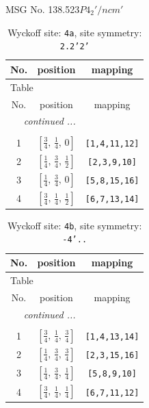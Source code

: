 \documentclass[fleqn,8pt]{jsarticle}
\begin{document}
\setcounter{MaxMatrixCols}{32}

\renewcommand{\tablename}{Table~}
\renewcommand{\figurename}{Figure~}
\begin{center}
\LARGE
MSG No. 138.523\quad$P4_{2}'/ncm'$
\end{center}
\renewcommand{\arraystretch}{1.2}
\begin{longtable}{ccc}
\caption{Wyckoff site: {\tt 4a}, site symmetry: {\tt 2.2'2'}}
 \\
 \hline \hline
No. & position & mapping \\ \hline \endfirsthead

\multicolumn{2}{l}{\tablename\ \thetable{}} \\
 \hline \hline
No. & position & mapping \\ \hline \endhead

 \hline \hline
\multicolumn{2}{r}{\footnotesize\it continued ...} \\ \endfoot

 \hline \hline
\multicolumn{2}{r}{} \\ \endlastfoot

1 & $\left[ \frac{3}{4},\, \frac{1}{4},\, 0 \right]$ & {\tt [1,4,11,12]} \\ \hline
2 & $\left[ \frac{1}{4},\, \frac{3}{4},\, \frac{1}{2} \right]$ & {\tt [2,3,9,10]} \\ \hline
3 & $\left[ \frac{1}{4},\, \frac{3}{4},\, 0 \right]$ & {\tt [5,8,15,16]} \\ \hline
4 & $\left[ \frac{3}{4},\, \frac{1}{4},\, \frac{1}{2} \right]$ & {\tt [6,7,13,14]} \\
\end{longtable}
\renewcommand{\arraystretch}{1.2}
\begin{longtable}{ccc}
\caption{Wyckoff site: {\tt 4b}, site symmetry: {\tt -4'..}}
 \\
 \hline \hline
No. & position & mapping \\ \hline \endfirsthead

\multicolumn{2}{l}{\tablename\ \thetable{}} \\
 \hline \hline
No. & position & mapping \\ \hline \endhead

 \hline \hline
\multicolumn{2}{r}{\footnotesize\it continued ...} \\ \endfoot

 \hline \hline
\multicolumn{2}{r}{} \\ \endlastfoot

1 & $\left[ \frac{3}{4},\, \frac{1}{4},\, \frac{3}{4} \right]$ & {\tt [1,4,13,14]} \\ \hline
2 & $\left[ \frac{1}{4},\, \frac{3}{4},\, \frac{3}{4} \right]$ & {\tt [2,3,15,16]} \\ \hline
3 & $\left[ \frac{1}{4},\, \frac{3}{4},\, \frac{1}{4} \right]$ & {\tt [5,8,9,10]} \\ \hline
4 & $\left[ \frac{3}{4},\, \frac{1}{4},\, \frac{1}{4} \right]$ & {\tt [6,7,11,12]} \\
\end{longtable}
\end{document}
